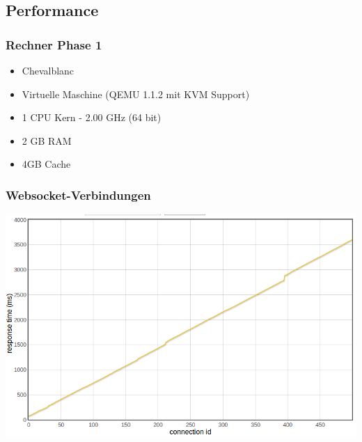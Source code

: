 \subsection{Performance}

\begin{frame}
\frametitle{Rechner Phase 1}
\begin{itemize}
	\item Chevalblanc
	\item Virtuelle Maschine (QEMU 1.1.2 mit KVM Support)
	\item 1 CPU Kern - 2.00 GHz (64 bit)
	\item 2 GB RAM
	\item 4GB Cache
	
\end{itemize}
\end{frame}

\begin{frame}
\frametitle{Websocket-Verbindungen}
	\begin{center}
		\includegraphics[scale=0.3]{performance/connection-response.png}
	
	\end{center}
\end{frame}

